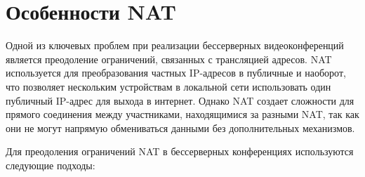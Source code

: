 \section{Особенности NAT}

Одной из ключевых проблем при реализации бессерверных видеоконференций является преодоление ограничений, связанных с трансляцией адресов.
NAT используется для преобразования частных IP-адресов в публичные и наоборот, что позволяет нескольким устройствам в локальной сети использовать один публичный IP-адрес для выхода в интернет.
Однако NAT создает сложности для прямого соединения между участниками, находящимися за разными NAT, так как они не могут напрямую обмениваться данными без дополнительных механизмов.

Для преодоления ограничений NAT в бессерверных конференциях используются следующие подходы:

